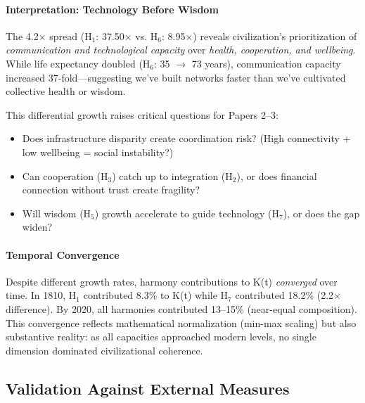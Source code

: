 \documentclass[11pt]{article}
\begin{document}
\paragraph{Interpretation: Technology Before Wisdom}

The 4.2$\times$ spread (H$_1$: 37.50$\times$ vs. H$_6$: 8.95$\times$) reveals
civilization's prioritization of \textit{communication and technological
capacity} over \textit{health, cooperation, and wellbeing}. While life
expectancy doubled (H$_6$: 35 $\rightarrow$ 73 years), communication capacity
increased 37-fold---suggesting we've built networks faster than we've cultivated
collective health or wisdom.

This differential growth raises critical questions for Papers 2--3:
\begin{itemize}
\item Does infrastructure disparity create coordination risk? (High connectivity
+ low wellbeing = social instability?)
\item Can cooperation (H$_3$) catch up to integration (H$_2$), or does financial
connection without trust create fragility?
\item Will wisdom (H$_5$) growth accelerate to guide technology (H$_7$), or does
the gap widen?
\end{itemize}

\paragraph{Temporal Convergence}

Despite different growth rates, harmony contributions to K(t) \textit{converged}
over time. In 1810, H$_1$ contributed 8.3\% to K(t) while H$_7$ contributed
18.2\% (2.2$\times$ difference). By 2020, all harmonies contributed 13--15\%
(near-equal composition). This convergence reflects mathematical normalization
(min-max scaling) but also substantive reality: as all capacities approached
modern levels, no single dimension dominated civilizational coherence.


\subsection{Validation Against External Measures}
\label{sec:validation-results}
\end{document}
